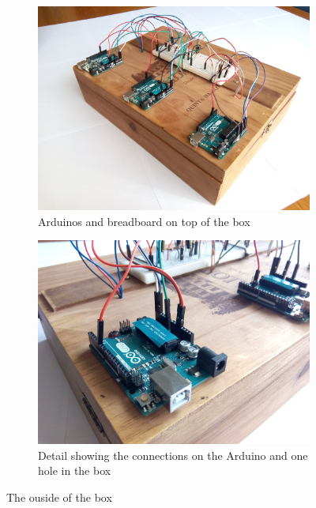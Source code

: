\begin{figure}[h]
    \centering
    \begin{subfigure}[t]{0.49\textwidth}
        \centering
        \includegraphics[width=\textwidth]{img/setup_box_closed}
        \caption{Arduinos and breadboard on top of the box}
        \label{fig:setup_box_closed}
    \end{subfigure}
    \begin{subfigure}[t]{0.49\textwidth}
        \centering
        \includegraphics[width=\textwidth]{img/setup_arduino_connections.jpg}
        \caption{Detail showing the connections on the Arduino and one hole in the box}
        \label{fig:setup_arduino_connections}
    \end{subfigure}
    \caption{The ouside of the box}
    \label{fig:setup_box_outside}
\end{figure}


